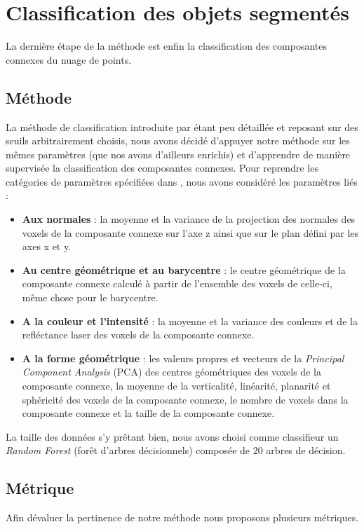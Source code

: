 \documentclass[a4paper, onecolumn, 11pt]{article}
\begin{document}
\section{Classification des objets segmentés}
La dernière étape de la méthode est enfin la classification des composantes connexes du nuage de points. 

\subsection{Méthode}
La méthode de classification introduite par \cite{aka_article} étant peu détaillée et reposant sur des seuils arbitrairement choisis, nous avons décidé d'appuyer notre méthode sur les mêmes paramètres (que nos avons d'ailleurs enrichis) et d'apprendre de manière supervisée la classification des composantes connexes. Pour reprendre les catégories de paramètres spécifiées dans \cite{aka_article}, nous avons considéré les paramètres liés :
\begin{itemize}
\item \textbf{Aux normales} : la moyenne et la variance de la projection des normales des voxels de la composante connexe sur l'axe z ainsi que sur le plan défini par les axes x et y.
\item \textbf{Au centre géométrique et au barycentre} : le centre géométrique de la composante connexe calculé à partir de l'ensemble des voxels de celle-ci, même chose pour le barycentre.
\item \textbf{A la couleur et l'intensité} : la moyenne et la variance des couleurs et de la refléctance laser des voxels de la composante connexe.
\item \textbf{A la forme géométrique} : les valeurs propres et vecteurs de la \emph{Principal Component Analysis} (PCA) des centres géométriques des voxels de la composante connexe, la moyenne de la verticalité, linéarité, planarité et sphéricité  des voxels de la composante connexe, le nombre de voxels dans la composante connexe et la taille de la composante connexe.
\end{itemize}
La taille des données s'y prêtant bien, nous avons choisi comme classifieur un \emph{Random Forest} (forêt d'arbres décisionnels) composée de $20$ arbres de décision.

\subsection{Métrique}

Afin dévaluer la pertinence de notre méthode nous proposons plusieurs métriques.
\end{document}
